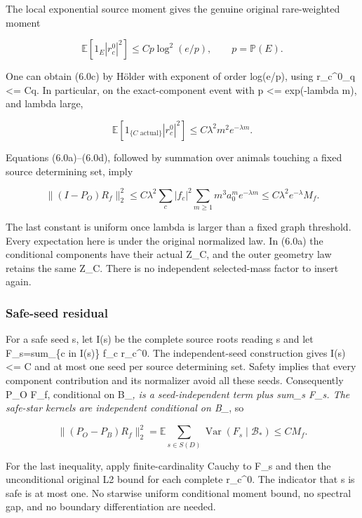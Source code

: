 \documentclass[
  11pt,
]{article}
\begin{document}
The local exponential source moment gives the genuine original
rare-weighted moment

\[
 \mathbb E[1_E|r_c^0|^2]
 \le C p\log^2(e/p),\qquad p=\mathbb P(E).
 \tag{6.0c}
\]

One can obtain (6.0c) by Hölder with exponent of order log(e/p), using
\textbar\textbar r\_c\^{}0\textbar\textbar\_q \textless= Cq. In
particular, on the exact-component event with p \textless= exp(-lambda
m), and lambda large,

\[
 \mathbb E[1_{\{C\text{ actual}\}}|r_c^0|^2]
 \le C\lambda^2m^2 e^{-\lambda m}.
 \tag{6.0d}
\]

Equations (6.0a)--(6.0d), followed by summation over animals touching a
fixed source determining set, imply

\[
 \|(I-P_O)R_f\|_2^2
 \le C\lambda^2\sum_c|f_c|^2
        \sum_{m\ge1}m^3a_0^m e^{-\lambda m}
 \le C\lambda^2e^{-\lambda}M_f.
 \tag{6.0e}
\]

The last constant is uniform once lambda is larger than a fixed graph
threshold. Every expectation here is under the original normalized law.
In (6.0a) the conditional components have their actual Z\_C, and the
outer geometry law retains the same Z\_C. There is no independent
selected-mass factor to insert again.

\hypertarget{safe-seed-residual}{%
\subsubsection{Safe-seed residual}\label{safe-seed-residual}}

For a safe seed s, let I(s) be the complete source roots reading s and
let F\_s=sum\_\{c in I(s)\} f\_c r\_c\^{}0. The independent-seed
construction gives \textbar I(s)\textbar{} \textless= C and at most one
seed per source determining set. Safety implies that every component
contribution and its normalizer avoid all these seeds. Consequently P\_O
F\_f, conditional on B\_\emph{, is a seed-independent term plus sum\_s
F\_s. The safe-star kernels are independent conditional on B\_}, so

\[
 \|(P_O-P_B)R_f\|_2^2
 =\mathbb E\sum_{s\in S(D)}
       \operatorname{Var}(F_s\mid\mathcal B_*)
 \le C M_f.
 \tag{6.0f}
\]

For the last inequality, apply finite-cardinality Cauchy to F\_s and
then the unconditional original L2 bound for each complete r\_c\^{}0.
The indicator that s is safe is at most one. No starwise uniform
conditional moment bound, no spectral gap, and no boundary
differentiation are needed.
\end{document}
